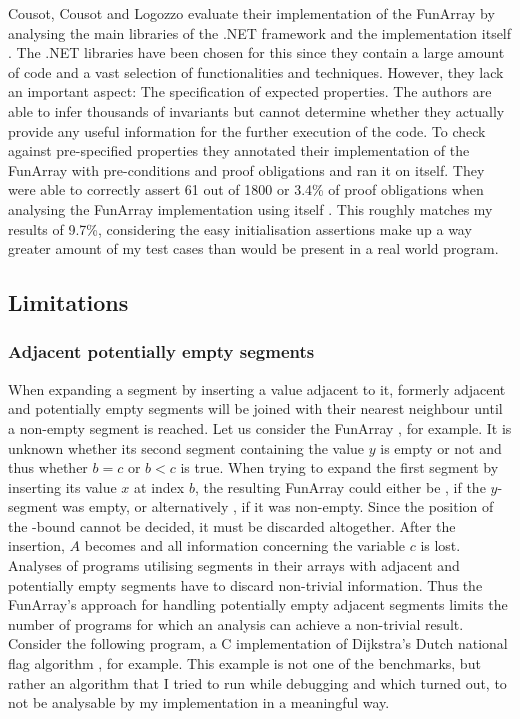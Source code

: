 Cousot, Cousot and Logozzo evaluate their implementation of the FunArray by analysing the main libraries of the .NET framework and the implementation itself \cite{cousot2011}. The .NET libraries have been chosen for this since they contain a large amount of code and a vast selection of functionalities and techniques. However, they lack an important aspect: The specification of expected properties. The authors are able to infer thousands of invariants but cannot determine whether they actually provide any useful information for the further execution of the code. To check against pre-specified properties they annotated their implementation of the FunArray with pre-conditions and proof obligations and ran it on itself. They were able to correctly assert 61 out of 1800 or 3.4\% of proof obligations when analysing the FunArray implementation using itself \cite{cousot2011}. This roughly matches my results of 9.7\%, considering the easy initialisation assertions make up a way greater amount of my test cases than would be present in a real world program.

\subsection{Limitations}

\subsubsection{Adjacent potentially empty segments}
When expanding a segment by inserting a value adjacent to it, formerly adjacent and potentially empty segments will be joined with their nearest neighbour until a non-empty segment is reached. Let us consider the FunArray , for example. It is unknown whether its second segment containing the value $y$ is empty or not and thus whether $b=c$ or $b<c$ is true.
When trying to expand the first segment by inserting its value $x$ at index $b$, the resulting FunArray could either be , if the $y$-segment was empty, or alternatively , if it was non-empty. Since the position of the -bound cannot be decided, it must be discarded altogether. After the insertion, $A$ becomes  and all information concerning the variable $c$ is lost.
Analyses of programs utilising segments in their arrays with adjacent and potentially empty segments have to discard non-trivial information. Thus the FunArray's approach for handling potentially empty adjacent segments limits the number of programs for which an analysis can achieve a non-trivial result. Consider the following program, a C implementation of Dijkstra's Dutch national flag algorithm \cite{dijkstra1976}, for example. This example is not one of the benchmarks, but rather an algorithm that I tried to run while debugging and which turned out, to not be analysable by my implementation in a meaningful way.
 
